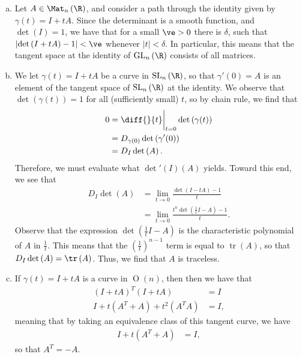 \documentclass[10pt]{mypackage}
\begin{document}
\begin{solution}\hfill
  \begin{enumerate}[(a)]
    \item Let $A\in \Mat_{n}\left( \R \right)$, and consider a path through the identity given by $\gamma(t) = I + tA$. Since the determinant is a smooth function, and $\det\left( I \right) = 1$, we have that for a small $\ve > 0$ there is $\delta$, such that $ \left\vert \det\left( I + tA \right) - 1 \right\vert < \ve$ whenever $\left\vert t \right\vert < \delta$. In particular, this means that the tangent space at the identity of $ \operatorname{GL}_n\left( \R \right) $ consists of all matrices.
    \item We let $\gamma(t) = I + tA$ be a curve in $ \operatorname{SL}_n\left( \R \right) $, so that $ \gamma'(0) = A $ is an element of the tangent space of $ \operatorname{SL}_n\left( \R \right) $ at the identity. We observe that $\det\left( \gamma(t) \right) = 1$ for all (sufficiently small) $t$, so by chain rule, we find that
      \begin{align*}
        0 &= \diff{}{t}\biggr\vert_{t = 0} \det\left( \gamma(t) \right)\\
          &= D_{\gamma(0)}\det\left( \gamma'(0) \right)\\
          &= D_{I}\det\left( A \right).
      \end{align*}
      Therefore, we must evaluate what $\det'\left( I \right)\left( A \right)$ yields. Toward this end, we see that
      \begin{align*}
        D_I\det\left( A \right) &= \lim_{t\rightarrow 0} \frac{\det\left( I - tA \right) - 1}{t}\\
                                &= \lim_{t\rightarrow 0} \frac{t^{n}\det\left( \frac{1}{t}I - A \right)-1}{t}.
      \end{align*}
      Observe that the expression $ \det\left( \frac{1}{t}I - A \right) $ is the characteristic polynomial of $A$ in $\frac{1}{t}$. This means that the $\left( \frac{1}{t} \right)^{n-1}$ term is equal to $ \operatorname{tr}\left( A \right) $, so that $D_I\det\left( A \right) = \tr\left( A \right)$. Thus, we find that $A$ is traceless.
    \item If $ \gamma\left( t \right) = I + tA $ is a curve in $ \operatorname{O}(n) $, then then we have that
      \begin{align*}
        \left( I + tA \right)^{T}\left( I + tA \right) &= I\\
        I + t\left( A^{T} + A \right) + t^2\left( A^{T}A \right) &= I,
      \end{align*}
      meaning that by taking an equivalence class of this tangent curve, we have
      \begin{align*}
        I + t\left( A^{T} + A \right) &= I,
      \end{align*}
      so that $A^{T} = -A$.\newline


\end{enumerate}
\end{solution}
\end{document}
